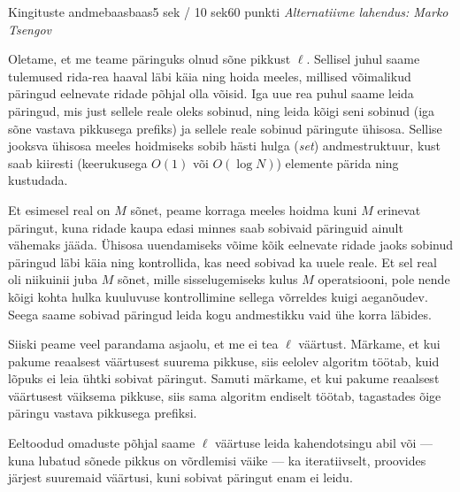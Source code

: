 \begin{yl}{5}{Kingituste andmebaas}{baas}{5 sek / 10 sek}{60 punkti}
\textit{Alternatiivne lahendus: Marko Tsengov}

Oletame, et me teame päringuks olnud sõne pikkust $\ell$.
Sellisel juhul saame tulemused rida-rea haaval läbi käia ning hoida meeles, millised võimalikud päringud eelnevate ridade põhjal olla võisid.
Iga uue rea puhul saame leida päringud, mis just sellele reale oleks sobinud, ning leida kõigi seni sobinud (iga sõne vastava pikkusega prefiks) ja sellele reale sobinud päringute ühisosa.
Sellise jooksva ühisosa meeles hoidmiseks sobib hästi hulga (\textit{set}) andmestruktuur, kust saab kiiresti (keerukusega $O(1)$ või $O(\log N)$) elemente pärida ning kustudada.

Et esimesel real on $M$ sõnet, peame korraga meeles hoidma kuni $M$ erinevat päringut, kuna ridade kaupa edasi minnes saab sobivaid päringuid ainult vähemaks jääda.
Ühisosa uuendamiseks võime kõik eelnevate ridade jaoks sobinud päringud läbi käia ning kontrollida, kas need sobivad ka uuele reale.
Et sel real oli niikuinii juba $M$ sõnet, mille sisselugemiseks kulus $M$ operatsiooni, pole nende kõigi kohta hulka kuuluvuse kontrollimine sellega võrreldes kuigi aeganõudev.
Seega saame sobivad päringud leida kogu andmestikku vaid ühe korra läbides.

Siiski peame veel parandama asjaolu, et me ei tea $\ell$ väärtust.
Märkame, et kui pakume reaalsest väärtusest suurema pikkuse, siis eelolev algoritm töötab, kuid lõpuks ei leia ühtki sobivat päringut.
Samuti märkame, et kui pakume reaalsest väärtusest väiksema pikkuse, siis sama algoritm endiselt töötab, tagastades õige päringu vastava pikkusega prefiksi.

Eeltoodud omaduste põhjal saame $\ell$ väärtuse leida kahendotsingu abil või --- kuna lubatud sõnede pikkus on võrdlemisi väike --- ka iteratiivselt, proovides järjest suuremaid väärtusi, kuni sobivat päringut enam ei leidu.

\end{yl}
